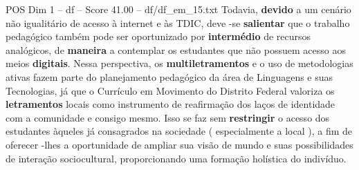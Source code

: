 \begin{textsample}{POS Dim 1 – df – Score 41.00 – df/df\_em\_15.txt}
Todavia, \textbf{devido} a um cenário não igualitário de acesso à internet e às TDIC, deve -se \textbf{salientar} que o trabalho pedagógico também pode ser oportunizado por \textbf{intermédio} de recursos analógicos, de \textbf{maneira} a contemplar os estudantes que não possuem acesso aos meios \textbf{digitais}.
Nessa perspectiva, os \textbf{multiletramentos} e o uso de metodologias ativas fazem parte do planejamento pedagógico da área de Linguagens e suas Tecnologias, já que o Currículo em Movimento do Distrito Federal valoriza os \textbf{letramentos} locais como instrumento de reafirmação dos laços de identidade com a comunidade e consigo mesmo.
Isso se faz sem \textbf{restringir} o acesso dos estudantes àqueles já consagrados na sociedade ( especialmente a local ), a fim de oferecer -lhes a oportunidade de ampliar sua visão de mundo e suas possibilidades de interação sociocultural, proporcionando uma formação holística do indivíduo.

\end{textsample}
